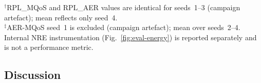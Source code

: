 \begin{aertablecol}[t]
  \caption{Descriptive performance metrics under lossy UDGM channel ($\mathrm{success\_ratio}{=}0.85$, $N{=}4$ seeds).}
  \label{tab:empirical-summary}
  \begingroup\setlength{\tabcolsep}{2.5pt}%
  \endgroup
  \vspace{0.2em}
  \raggedright
  $^\dagger$RPL\_MQoS and RPL\_AER values are identical for seeds~1--3 (campaign artefact); mean reflects only seed~4.\\
  $^\ddagger$AER-MQoS seed~1 is excluded (campaign artefact); mean over seeds~2--4.\\
  Internal NRE instrumentation (Fig.~\ref{fig:eval-energy}) is reported separately and is not a performance metric.
\end{aertablecol}

\subsection{Discussion}
\label{sec:discussion}


